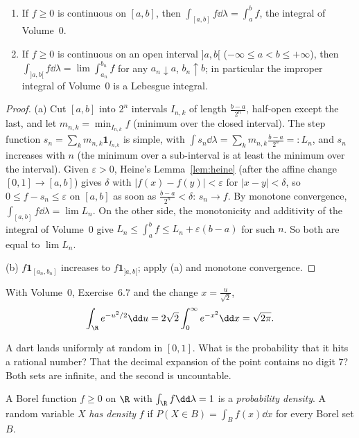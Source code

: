 \begin{proposition}\label{prop:riemann}
\begin{enumerate}[label=(\alph*)]
\item If $f\ge0$ is continuous on $[a,b]$, then $\int_{[a,b]}f\dd\lambda=\int_a^bf$, the integral of Volume~0.
\item If $f\ge0$ is continuous on an open interval $]a,b[$ ($-\infty\le a<b\le+\infty$), then $\int_{]a,b[}f\dd\lambda=\lim\int_{a_n}^{b_n}f$ for any $a_n\downarrow a$,
$b_n\uparrow b$; in particular the improper integral of Volume~0 is a Lebesgue integral.
\end{enumerate}
\end{proposition}
\begin{proof}
(a) Cut $[a,b]$ into $2^n$ intervals $I_{n,k}$ of length $\frac{b-a}{2^n}$, half-open except the last, and let $m_{n,k}=\min_{I_{n,k}}f$ (minimum over the
closed interval). The step function $s_n=\sum_km_{n,k}\mathbf 1_{I_{n,k}}$ is simple, with $\int s_n\dd\lambda=\sum_km_{n,k}\frac{b-a}{2^n}=:L_n$, and $s_n$ increases with $n$
(the minimum over a sub-interval is at least the minimum over the interval). Given $\varepsilon>0$, Heine's Lemma~\ref{lem:heine} (after
the affine change $[0,1]\to[a,b]$) gives $\delta$ with $|f(x)-f(y)|<\varepsilon$ for $|x-y|<\delta$, so $0\le f-s_n\le\varepsilon$ on $[a,b]$ as soon as
$\frac{b-a}{2^n}<\delta$: $s_n\to f$. By monotone convergence, $\int_{[a,b]}f\dd\lambda=\lim L_n$. On the other side, the monotonicity and additivity of the
integral of Volume~0 give $L_n\le\int_a^bf\le L_n+\varepsilon(b-a)$ for such $n$. So both are equal to $\lim L_n$.

(b) $f\mathbf 1_{[a_n,b_n]}$ increases to $f\mathbf 1_{]a,b[}$; apply (a) and monotone convergence.
\end{proof}

With Volume~0, Exercise~6.7 and the change $x=\frac u{\sqrt2}$,
\[
\int_\R e^{-u^2/2}\dd u=2\sqrt2\int_0^\infty e^{-x^2}\dd x=\sqrt{2\pi}.
\]

\begin{think}
A dart lands uniformly at random in $[0,1]$. What is the probability that it hits a rational number? That the decimal
expansion of the point contains no digit $7$? Both sets are infinite, and the second is uncountable.
\end{think}

\begin{definition}
A Borel function $f\ge0$ on $\R$ with $\int_\R f\dd\lambda=1$ is a \emph{probability density}. A random variable $X$ \emph{has density} $f$ if
$P(X\in B)=\int_Bf(x)\dd x$ for every Borel set $B$.
\end{definition}

